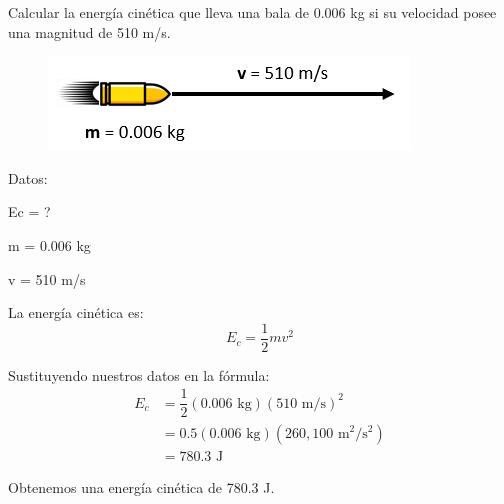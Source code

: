 Calcular la energía cinética que lleva una bala de 0.006 kg si su velocidad posee una magnitud de 510 m/s.

\begin{minipage}{0.3\textwidth}
    \begin{figure}[H]
        \includegraphics[width=\linewidth]{../images/energia_cinetica_problema_1.png}
    \end{figure}
\end{minipage}\hfill
\begin{minipage}{0.65\textwidth}
    \begin{solutionbox}{6cm}
        \begin{multicols}{2}
            Datos:

            Ec = ?

            m = 0.006 kg

            v = 510 m/s

            La energía cinética es:
            \[E_c=\frac{1}{2}mv^2\]

            \vspace{2cm}

            Sustituyendo nuestros datos en la fórmula:
            \[
                \begin{array}{rl}
                    E_c & = \dfrac{1}{2} (0.006 \text{ kg})(510 \text{ m/s})^2  \\[1em]
                        & = 0.5 (0.006 \text{ kg})(260,100 \text{ m$^2$/s$^2$}) \\[1em]
                        & =780.3 \text{ J }
                \end{array}
            \]
        \end{multicols}
        \begin{center}Obtenemos una energía cinética de 780.3 J.\end{center}
    \end{solutionbox}
\end{minipage}